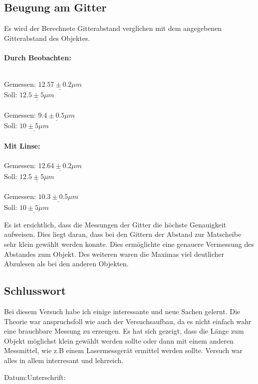 \subsection{Beugung am Gitter}
Es wird der Berechnete Gitterabstand verglichen mit dem angegebenen Gitterabstand des Objektes.\\
\\
\textbf{Durch Beobachten:}
\begin{tabbing}
\hspace{40mm}			\=  	\\
Gemessen: \> $\underline{12.57 \pm 0.2\mu m}$			\\
Soll:	\> $\underline{12.5\pm 5 \mu m}$			\\
\\
Gemessen: \> $\underline{9.4 \pm 0.5\mu m}$		\\
Soll:	\> $\underline{10 \pm 5\mu m}$			\\
\\
\textbf{Mit Linse:}		\\
\\
Gemessen: \> $\underline{12.64 \pm 0.2\mu m}$			\\
Soll:	\> $\underline{12.5\pm 5 \mu m}$			\\
\\
Gemessen: \> $\underline{10.3 \pm 0.5\mu m}$		\\
Soll:	\> $\underline{10 \pm 5\mu m}$			\\
\end{tabbing}

Es ist ersichtlich, dass die Messungen der Gitter die höchste Genauigkeit aufweisen. Dies liegt daran, dass bei den Gittern der Abstand zur Matscheibe sehr klein gewählt werden konnte. Dies ermöglichte eine genauere Vermessung des Abstandes zum Objekt. Des weiteren waren die Maximas viel deutlicher Abzulesen als bei den anderen Objekten.

\subsection{Schlusswort}
Bei diesem Versuch habe ich einige interessante und neue Sachen gelernt. Die Theorie war anspruchsfoll wie auch der Versuchsaufbau, da es nicht einfach wahr eine brauchbare Messung zu erzeugen. Es hat sich gezeigt, dass die Länge zum Objekt möglichst klein gewählt werden sollte oder dann mit einem anderen Messmittel, wie z.B einem Lasermessgerät ermittel werden sollte. Versuch war alles in allem interresant und lehrreich.

\vspace{3mm}
Datum:\hspace{50mm}Unterschrift:
